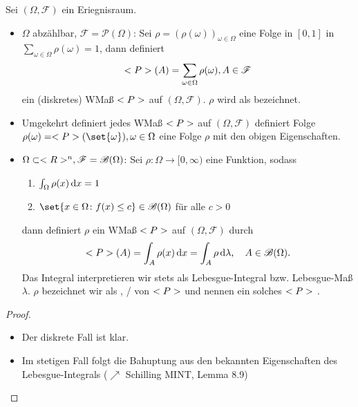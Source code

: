 \begin{proposition}
	Sei $(\Omega, \mathscr{F})$ ein Eriegnisraum.
	\begin{itemize}
		\item $\Omega$ abzählbar, $\mathscr{F} = \mathscr{P}(\Omega)$: Sei $\rho = (\rho(\omega))_{\omega \in \Omega}$ eine Folge in $[0,1]$ in $\sum_{\omega \in \Omega} \rho(\omega) = 1$, dann definiert
		\begin{align}
			<P>(A) = \sum_{\omega \in \Omega} \rho(\omega), A \in \mathscr{F} \notag
		\end{align}
		ein (diskretes) WMaß $<P>$ auf $(\Omega, \mathscr{F})$. $\rho$ wird als  bezeichnet.
		\item Umgekehrt definiert jedes WMaß $<P>$ auf $(\Omega, \mathscr{F})$ definiert Folge $\rho(\omega) = \probp(\set{\omega}), \omega \in \Omega$ eine Folge $\rho$ mit den obigen Eigenschaften.
		\item $\Omega \subset <R>^n, \mathscr{F} = \mathscr{B}(\Omega)$: Sei $\rho: \Omega \to [0, \infty)$ eine Funktion, sodass
		\begin{enumerate}
			\item $\int_{\Omega} \rho(x)\,\mathrm{d} x = 1$
			\item $\set{x \in \Omega \colon f(x) \le c} \in \mathscr{B}(\Omega)$ für alle $c > 0$ 
		\end{enumerate}
		dann definiert $\rho$ ein WMaß $<P>$ auf $(\Omega, \mathscr{F})$ durch 
		\begin{align}
		<P>(A) = \int_{A} \rho(x) \,\mathrm{d} x = \int_{A} \rho \,\mathrm{d} \lambda, \quad A \in \mathscr{B}(\Omega).\notag
		\end{align}
		Das Integral interpretieren wir stets als Lebesgue-Integral bzw. Lebesgue-Maß $\lambda$.
		$\rho$ bezeichnet wir als , / von $<P>$ und nennen ein solches $<P>$ .
	\end{itemize}
\end{proposition}

\begin{proof}
	\begin{itemize}
		\item Der diskrete Fall ist klar.
		\item Im stetigen Fall folgt die Bahuptung aus den bekannten Eigenschaften des Lebesgue-Integrals ($\nearrow$ Schilling MINT, Lemma 8.9)
	\end{itemize}
\end{proof}

